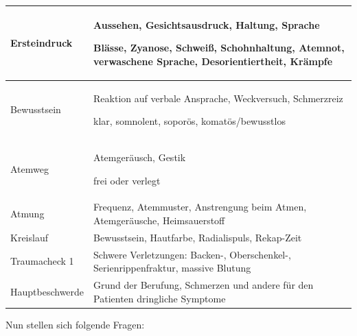 \documentclass{article}
\begin{document}
\begin{center}
\tablehead{}\begin{supertabular}{|m{3.158cm}m{10.142cm}|}
\hline
\centering Ersteindruck\par

 &
Aussehen, Gesichtsausdruck, Haltung, Sprache

Bl\"asse, Zyanose, Schwei{\ss}, Schohnhaltung, Atemnot, verwaschene
Sprache, Des\-orientiertheit, Kr\"ampfe 

\\\hline
\centering Bewusstsein\par

 &
Reaktion auf verbale Ansprache, Weckversuch, Schmerzreiz

klar, somnolent, sopor\"os, komat\"os/bewusstlos

\\\hline
\centering Atemweg\par

 &
Atemger\"ausch, Gestik

frei oder verlegt

\\\hline
\centering Atmung\par

 &
Frequenz, Atemmuster, Anstrengung beim Atmen, Atemger\"ausche,
Heimsauerstoff

\\\hline
\centering Kreislauf\par

 &
Bewusstsein, Hautfarbe, Radialispuls, Rekap-Zeit

\\\hline
\centering Traumacheck 1\par

 &
Schwere Verletzungen: Backen-, Oberschenkel-, Serienrippenfraktur,
massive Blutung

\\\hline
\centering Hauptbeschwerde\par

 &
Grund der Berufung, Schmerzen und andere f\"ur den Patienten dringliche
Symptome

\\\hline
\end{supertabular}
\end{center}
Nun stellen sich folgende Fragen:
\end{document}
